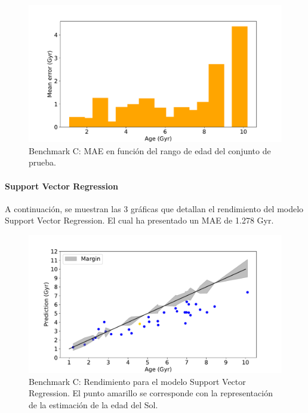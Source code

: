 \begin{figure}[H]
\begin{center}
 \includegraphics[width=0.8\linewidth]{Figuras/Experimentos/B_C_rf_3.pdf}
\end{center}
\caption{Benchmark C: MAE en función del rango de edad del conjunto de prueba.}
 \label{fig:benchC_details_rf_3}
\end{figure}

\paragraph{Support Vector Regression} 
A continuación, se muestran las 3 gráficas que detallan el rendimiento del modelo Support Vector Regression. El cual ha presentado un MAE de 1.278 Gyr.

\begin{figure}[H]
\begin{center}
 \includegraphics[width=0.8\linewidth]{Figuras/Experimentos/B_C_svm_1.pdf}
\end{center}
\caption{Benchmark C: Rendimiento para el modelo Support Vector Regression. El punto amarillo se corresponde con la representación de la estimación de la edad del Sol.}
 \label{fig:benchC_details_svm_1}
\end{figure}

